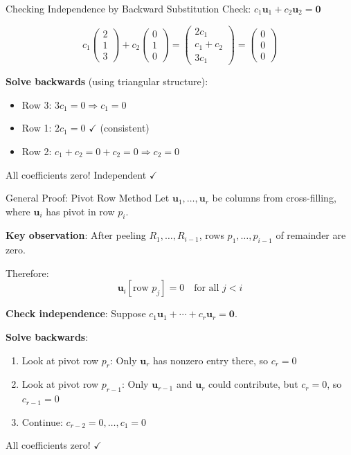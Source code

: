 \documentclass[10pt]{beamer}
\theoremstyle{definition}
\newcommand{\x}[1]{\alert{\textbf{#1}}}
\begin{document}
\begin{frame}{Checking Independence by Backward Substitution}
Check: $c_1\mathbf{u}_1 + c_2\mathbf{u}_2 = \mathbf{0}$

$$c_1\begin{pmatrix} 2 \\ 1 \\ 3 \end{pmatrix} + c_2\begin{pmatrix} 0 \\ 1 \\ 0 \end{pmatrix} = \begin{pmatrix} 2c_1 \\ c_1 + c_2 \\ 3c_1 \end{pmatrix} = \begin{pmatrix} 0 \\ 0 \\ 0 \end{pmatrix}$$

\vfill
\textbf{Solve backwards} (using triangular structure):
\begin{itemize}
\item Row 3: $3c_1 = 0 \Rightarrow c_1 = 0$
\item Row 1: $2c_1 = 0$ $\checkmark$ (consistent)
\item Row 2: $c_1 + c_2 = 0 + c_2 = 0 \Rightarrow c_2 = 0$
\end{itemize}

\vfill
All coefficients zero! Independent $\checkmark$
\end{frame}

\begin{frame}{General Proof: Pivot Row Method}
Let $\mathbf{u}_1, \ldots, \mathbf{u}_r$ be columns from cross-filling, where $\mathbf{u}_i$ has pivot in row $p_i$.

\vfill
\x{Key observation}: After peeling $R_1, \ldots, R_{i-1}$, rows $p_1, \ldots, p_{i-1}$ of remainder are zero.

Therefore:
$$\mathbf{u}_i[\text{row } p_j] = 0 \quad \text{for all } j < i$$

\vfill
\textbf{Check independence}: Suppose $c_1\mathbf{u}_1 + \cdots + c_r\mathbf{u}_r = \mathbf{0}$.

\x{Solve backwards}:
\begin{enumerate}
\item Look at pivot row $p_r$: Only $\mathbf{u}_r$ has nonzero entry there, so $c_r = 0$
\item Look at pivot row $p_{r-1}$: Only $\mathbf{u}_{r-1}$ and $\mathbf{u}_r$ could contribute, but $c_r = 0$, so $c_{r-1} = 0$
\item Continue: $c_{r-2} = 0, \ldots, c_1 = 0$
\end{enumerate}

All coefficients zero! $\checkmark$
\end{frame}
\end{document}
